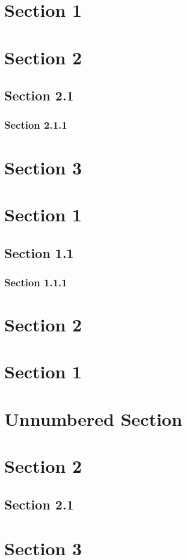 \hypertarget{_section_1}{\section*{Section 1}}
\hypertarget{_section_2}{\section*{Section 2}}
\hypertarget{_section_2.1}{\subsection*{Section 2.1}}
\hypertarget{_section_2.1.1}{\subsubsection*{Section 2.1.1}}
\hypertarget{_section_3}{\section*{Section 3}}

\hypertarget{_section_1}{\section*{Section 1}}
\hypertarget{_section_1.1}{\subsection*{Section 1.1}}
\hypertarget{_section_1.1.1}{\subsubsection*{Section 1.1.1}}
\hypertarget{_section_2}{\section*{Section 2}}

\hypertarget{_section_1}{\section{Section 1}}
\hypertarget{_unnumbered_section}{\section*{Unnumbered Section}}
\hypertarget{_section_2}{\section{Section 2}}
\hypertarget{_section_2.1}{\subsection{Section 2.1}}
\hypertarget{_section_3}{\section{Section 3}}

